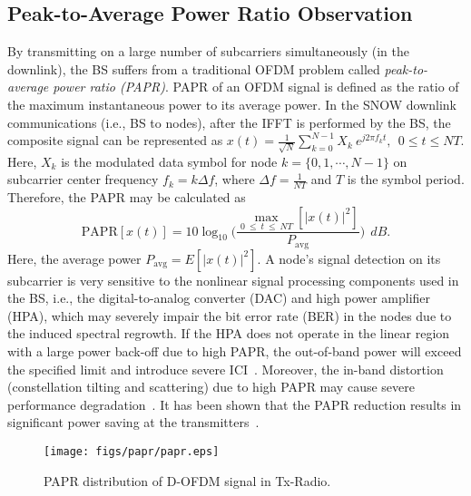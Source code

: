 \subsection{Peak-to-Average Power Ratio Observation}\label{sec:papr}
By transmitting on a large number of subcarriers simultaneously (in the downlink), the BS suffers from a traditional OFDM problem called {\em peak-to-average power ratio (PAPR)}. PAPR of an OFDM signal is defined as the ratio of the maximum instantaneous power to its average power.
In the SNOW downlink communications (i.e., BS to nodes), after the IFFT is performed by the BS, the composite signal can be represented as
$\nonumber x(t) = \frac{1}{\sqrt{N}}\sum_{k=0}^{N-1}X_k~e^{j2 \pi f_k t},~~0 \le t \le NT.$
Here, $X_k$ is the modulated data symbol for node $k = \{0, 1, \cdots, N-1\}$ on subcarrier center frequency $f_k = k\Delta f$, where $\Delta f = \frac{1}{NT}$ and $T$ is the symbol period. Therefore, the PAPR may be calculated as%
\begin{equation}
\nonumber \text{PAPR}[x(t)] = 10\log_{10}\Bigg( \frac{\max\limits_{0~ \le ~t~ \le~ NT} [|x(t)|^2 ]}{P_{\text{avg}}}\Bigg)~~dB.
\end{equation}
Here, the average power $P_{\text{avg}} = E [|x(t)|^2]$.
A node's signal detection on its subcarrier is very sensitive to the nonlinear signal processing components used in the BS, i.e., the digital-to-analog converter (DAC) and high power amplifier (HPA), which may severely impair the bit error rate (BER) in the nodes due to the induced spectral regrowth. If the HPA does not operate in the linear region with a large power back-off due to high PAPR, the out-of-band power will exceed the specified limit and introduce severe ICI~\cite{jiang2008overview}. Moreover, the in-band distortion (constellation tilting and scattering) due to high PAPR may cause severe performance degradation~\cite{kamali2012understanding}. It has been shown that the PAPR reduction results in significant power saving at the transmitters~\cite{baxley2004power}.
\begin{figure}[!htb]
\centering
\texttt{[image: figs/papr/papr.eps]}
\caption{PAPR distribution of D-OFDM signal in Tx-Radio.}
\label{fig:papr}
\end{figure}


